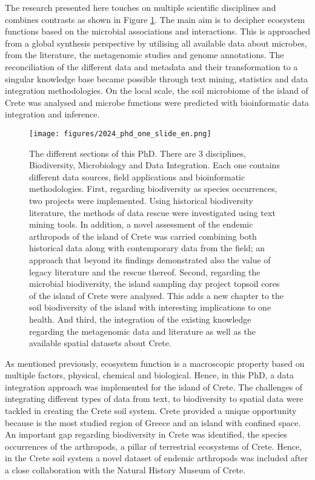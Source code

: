 The research presented here touches on multiple scientific disciplines and
combines contrasts as shown in Figure \ref{fig:phd-one-slide}. 
The main aim is to decipher ecosystem functions based on the 
microbial associations and interactions.
This is approached from a global synthesis perspective by 
utilising all available data about microbes, from the literature,
the metagenomic studies and genome annotations. 
The reconciliation of the different data and metadata and their 
transformation to a singular knowledge base 
became possible through text mining, statistics and data integration 
methodologies. 
On the local scale, the soil microbiome of the island of Crete was 
analysed and microbe functions were predicted 
with bioinformatic data integration and inference.

\begin{figure}[ht]
      \centering
      \texttt{[image: figures/2024\_phd\_one\_slide\_en.png]}
      \caption[Graphical abstract of this PhD]{The different sections of this PhD. There are 3 disciplines, Biodiversity, Microbiology and Data Integration. Each one contains different data sources, field applications and bioinformatic methodologies.
First, regarding biodiversity as species occurrences, two projects were implemented.
Using historical biodiversity literature, the methods of data rescue were 
investigated using text mining tools.
In addition, a novel assessment of the endemic arthropods of the island of Crete
was carried combining both historical data along with contemporary data from the field;
an approach that beyond its findings demonstrated also the value of legacy
literature and the rescue thereof.
Second, regarding the microbial biodiversity, the island sampling day project 
topsoil cores of the island of Crete were analysed. This adds a new chapter to 
the soil biodiversity of the island with interesting implications to one health.
And third, the integration of the existing knowledge regarding the metagenomic 
data and literature as well as the available spatial datasets about Crete. 
      }
      \label{fig:phd-one-slide}
   \end{figure}

As mentioned previously, ecosystem function is a macroscopic 
property based on multiple factors, physical, chemical and 
biological. Hence, in this PhD, a data integration 
approach was implemented for the island of Crete. The challenges of integrating 
different types of data from text, to biodiversity to spatial data
were tackled in creating the Crete soil system. 
Crete provided a unique opportunity because is the most 
studied region of Greece and an island with confined space.
An important gap regarding biodiversity in Crete was identified, the 
species occurrences of the arthropods, a pillar of 
terrestrial ecosystems of Crete. 
Hence, in the Crete soil system a novel dataset of endemic 
arthropods was included after a close collaboration 
with the Natural History Museum of Crete.
   
